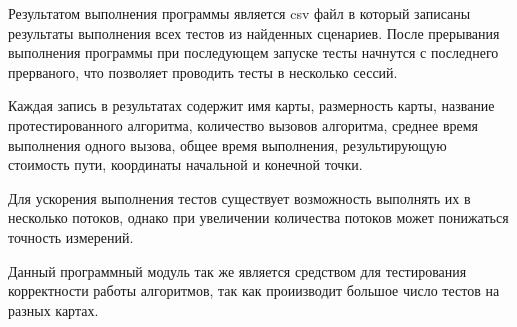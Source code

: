 Результатом выполнения программы является csv файл в который записаны результаты выполнения всех тестов из найденных сценариев. После прерывания выполнения программы при последующем запуске тесты начнутся с последнего прерваного, что позволяет проводить тесты в несколько сессий.

Каждая запись в результатах содержит имя карты, размерность карты, название протестированного алгоритма, количество вызовов алгоритма, среднее время выполнения одного вызова, общее время выполнения, результирующую стоимость пути, координаты начальной и конечной точки.  

Для ускорения выполнения тестов существует возможность выполнять их в несколько потоков, однако при увеличении количества потоков может понижаться точность измерений.

Данный программный модуль так же является средством для тестирования корректности работы алгоритмов, так как проиизводит большое число тестов на разных картах.